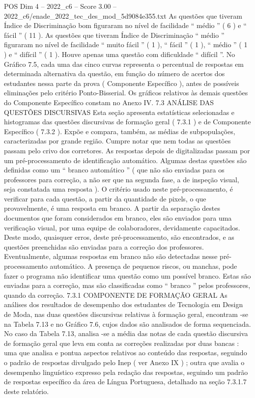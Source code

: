\begin{textsample}{POS Dim 4 – 2022\_c6 – Score 3.00 – 2022\_c6/enade\_2022\_tec\_des\_mod\_5d9084e355.txt}
As questões que tiveram Índice de Discriminação bom figuraram no nível de facilidade “ médio ” ( 6 ) e “ fácil ” ( 11 ).
As questões que tiveram Índice de Discriminação “ médio ” figuraram no nível de facilidade “ muito fácil ” ( 1 ), “ fácil ” ( 1 ), “ médio ” ( 1 ) e “ difícil ” ( 1 ).
Houve apenas uma questão com dificuldade “ difícil ”.
No Gráfico 7.5, cada uma das cinco curvas representa o percentual de respostas em determinada alternativa da questão, em função do número de acertos dos estudantes nessa parte da prova ( Componente Específico ), antes de possíveis eliminações pelo critério Ponto-Bisserial.
Os gráficos relativos às demais questões do Componente Específico constam no Anexo IV. 7.3 ANÁLISE DAS QUESTÕES DISCURSIVAS Esta seção apresenta estatísticas selecionadas e histogramas das questões discursivas de formação geral ( 7.3.1 ) e de Componente Específico ( 7.3.2 ).
Expõe e compara, também, as médias de subpopulações, caracterizadas por grande região.
Cumpre notar que nem todas as questões passam pelo crivo dos corretores.
As respostas depois de digitalizadas passam por um pré-processamento de identificação automático.
Algumas destas questões são definidas como um “ branco automático ” ( que não são enviadas para os professores para correção, a não ser que na segunda fase, a de inspeção visual, seja constatada uma resposta ).
O critério usado neste pré-processamento, é verificar para cada questão, a partir da quantidade de pixels, o que provavelmente, é uma resposta em branco.
A partir da separação destes documentos que foram considerados em branco, eles são enviados para uma verificação visual, por uma equipe de colaboradores, devidamente capacitados.
Deste modo, quaisquer erros, deste pré-processamento, são encontrados, e as questões preenchidas são enviadas para a correção dos professores.
Eventualmente, algumas respostas em branco não são detectadas nesse pré-processamento automático.
A presença de pequenos riscos, ou manchas, pode fazer o programa não identificar uma questão como um possível branco.
Estas são enviadas para a correção, mas são classificadas como “ branco ” pelos professores, quando da correção. 7.3.1 COMPONENTE DE FORMAÇÃO GERAL As análises dos resultados de desempenho dos estudantes de Tecnologia em Design de Moda, nas duas questões discursivas relativas à formação geral, encontram -se na Tabela 7.13 e no Gráfico 7.6, cujos dados são analisados de forma sequenciada.
No caso da Tabela 7.13, analisa -se a média das notas de cada questão discursiva de formação geral que leva em conta as correções realizadas por duas bancas : uma que analisa e pontua aspectos relativos ao conteúdo das respostas, seguindo o padrão de respostas divulgado pelo Inep ( ver Anexo IX ) ; outra que avalia o desempenho linguístico expresso pela redação das respostas, seguindo um padrão de respostas específico da área de Língua Portuguesa, detalhado na seção 7.3.1.7 deste relatório.

\end{textsample}

